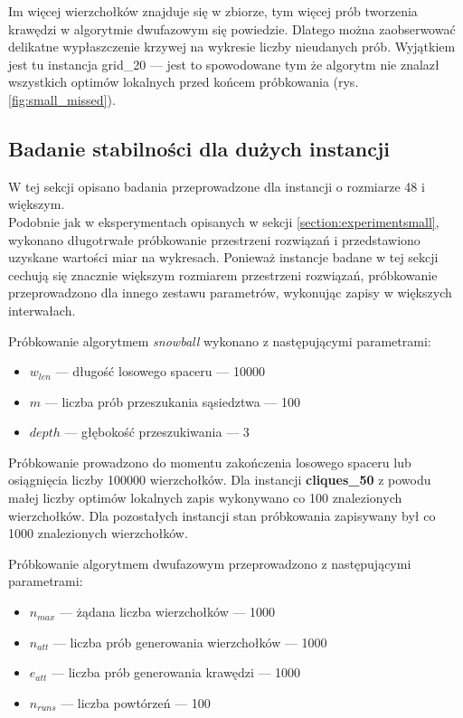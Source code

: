 Im więcej wierzchołków znajduje się w zbiorze, tym więcej prób tworzenia krawędzi w algorytmie dwufazowym
się powiedzie. Dlatego można zaobserwować delikatne wypłaszczenie krzywej na wykresie liczby nieudanych prób.
Wyjątkiem jest tu instancja grid\_20  --- jest to spowodowane tym że algorytm nie znalazł wszystkich optimów
lokalnych przed końcem próbkowania (rys. \ref{fig:small_missed}).

\newpage

\subsection{Badanie stabilności dla dużych instancji} \label{section:experimentmain}
W tej sekcji opisano badania przeprowadzone dla instancji o rozmiarze 48 i większym. \\
Podobnie jak w eksperymentach opisanych w sekcji \ref{section:experimentsmall}, wykonano długotrwałe próbkowanie przestrzeni rozwiązań
i przedstawiono uzyskane wartości miar na wykresach.
Ponieważ instancje badane w tej sekcji cechują się znacznie większym rozmiarem przestrzeni rozwiązań, próbkowanie przeprowadzono
dla innego zestawu parametrów, wykonując zapisy w większych interwałach.

Próbkowanie algorytmem \textit{snowball} wykonano z następującymi parametrami:
\begin{itemize}
    \item $w_{len}$ --- długość losowego spaceru --- 10000
    \item $m$ --- liczba prób przeszukania sąsiedztwa --- 100
    \item $depth$ --- głębokość przeszukiwania --- 3
\end{itemize}

Próbkowanie prowadzono do momentu zakończenia losowego spaceru lub osiągnięcia liczby 100000 wierzchołków.
Dla instancji \textbf{cliques\_50} z powodu małej liczby optimów lokalnych zapis wykonywano co 100 znalezionych wierzchołków.
Dla pozostałych instancji stan próbkowania zapisywany był co 1000 znalezionych wierzchołków.

Próbkowanie algorytmem dwufazowym przeprowadzono z następującymi parametrami:
\begin{itemize}
    \item $n_{max}$ --- żądana liczba wierzchołków --- 1000
    \item $n_{att}$ --- liczba prób generowania wierzchołków --- 1000
    \item $e_{att}$ --- liczba prób generowania krawędzi --- 1000
    \item $n_{runs}$ --- liczba powtórzeń --- 100
\end{itemize}

